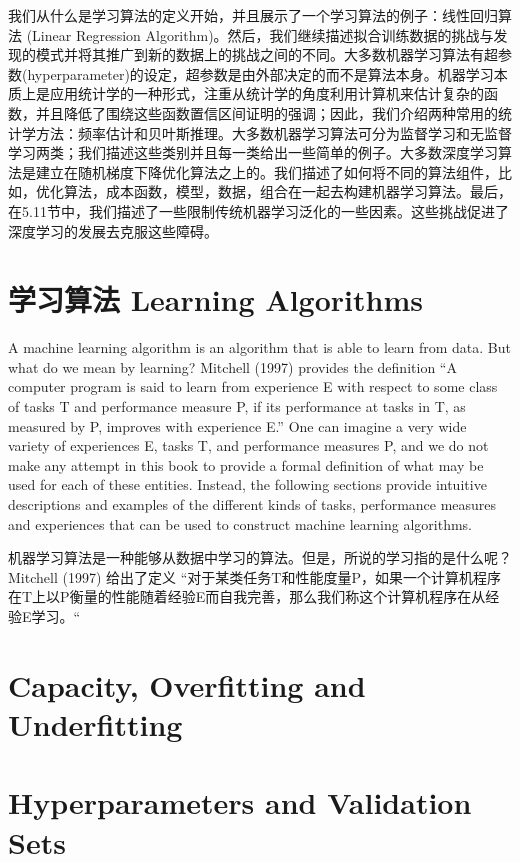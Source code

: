 我们从什么是学习算法的定义开始，并且展示了一个学习算法的例子：线性回归算法 (Linear Regression Algorithm)。然后，我们继续描述拟合训练数据的挑战与发现的模式并将其推广到新的数据上的挑战之间的不同。大多数机器学习算法有超参数(hyperparameter)的设定，超参数是由外部决定的而不是算法本身。机器学习本质上是应用统计学的一种形式，注重从统计学的角度利用计算机来估计复杂的函数，并且降低了围绕这些函数置信区间证明的强调；因此，我们介绍两种常用的统计学方法：频率估计和贝叶斯推理。大多数机器学习算法可分为监督学习和无监督学习两类；我们描述这些类别并且每一类给出一些简单的例子。大多数深度学习算法是建立在随机梯度下降优化算法之上的。我们描述了如何将不同的算法组件，比如，优化算法，成本函数，模型，数据，组合在一起去构建机器学习算法。最后，在5.11节中，我们描述了一些限制传统机器学习泛化的一些因素。这些挑战促进了深度学习的发展去克服这些障碍。



\section{学习算法 Learning Algorithms}

A machine learning algorithm is an algorithm that is able to learn from data. But what do we mean by learning? Mitchell (1997) provides the definition “A computer program is said to learn from experience E with respect to some class of tasks T and performance measure P, if its performance at tasks in T, as measured by P, improves with experience E.” One can imagine a very wide variety of experiences E, tasks T, and performance measures P, and we do not make any attempt in this book to provide a formal definition of what may be used for each of these entities. Instead, the following sections provide intuitive descriptions and examples of the different kinds of tasks, performance measures and experiences that can be used to construct machine learning algorithms.

机器学习算法是一种能够从数据中学习的算法。但是，所说的学习指的是什么呢？Mitchell (1997) 给出了定义 “对于某类任务T和性能度量P，如果一个计算机程序在T上以P衡量的性能随着经验E而自我完善，那么我们称这个计算机程序在从经验E学习。“

\section{Capacity, Overfitting and Underfitting}

\section{Hyperparameters and Validation Sets}

